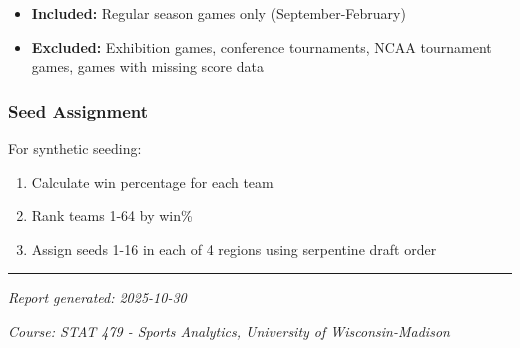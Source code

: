 \documentclass[
]{article}
\providecommand{\tightlist}{%
  \setlength{\itemsep}{0pt}\setlength{\parskip}{0pt}}
\begin{document}
\begin{itemize}
\tightlist
\item
  \textbf{Included:} Regular season games only (September-February)
\item
  \textbf{Excluded:} Exhibition games, conference tournaments, NCAA
  tournament games, games with missing score data
\end{itemize}

\subsubsection{Seed Assignment}\label{seed-assignment}

For synthetic seeding:

\begin{enumerate}
\def\labelenumi{\arabic{enumi}.}
\tightlist
\item
  Calculate win percentage for each team
\item
  Rank teams 1-64 by win\%
\item
  Assign seeds 1-16 in each of 4 regions using serpentine draft order
\end{enumerate}

\begin{center}\rule{0.5\linewidth}{0.5pt}\end{center}

\emph{Report generated: 2025-10-30}

\emph{Course: STAT 479 - Sports Analytics, University of
Wisconsin-Madison}
\end{document}
